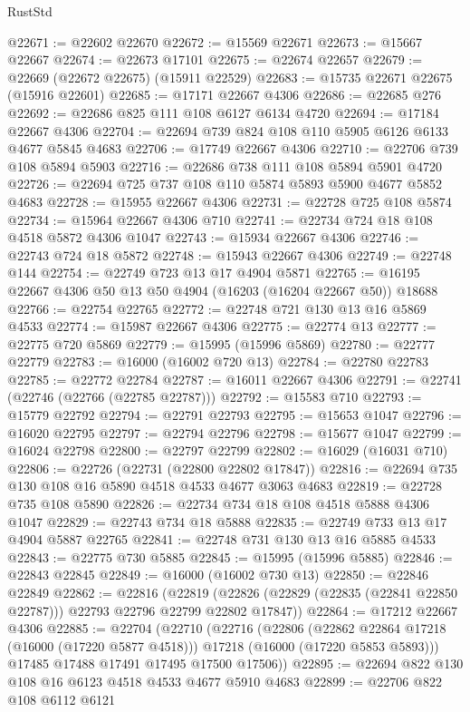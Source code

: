 \begin{lexlean}{RustStd}
\begin{coremodule}
@22671 := @22602 @22670
@22672 := @15569 @22671
@22673 := @15667 @22667
@22674 := @22673 @17101
@22675 := @22674 @22657
@22679 := @22669 (@22672 @22675) (@15911 @22529)
@22683 := @15735 @22671 @22675 (@15916 @22601)
@22685 := @17171 @22667 @4306
@22686 := @22685 @276
@22692 := @22686 @825 @111 @108 @6127 @6134 @4720
@22694 := @17184 @22667 @4306
@22704 := @22694 @739 @824 @108 @110 @5905 @6126 @6133 @4677 @5845 @4683
@22706 := @17749 @22667 @4306
@22710 := @22706 @739 @108 @5894 @5903
@22716 := @22686 @738 @111 @108 @5894 @5901 @4720
@22726 := @22694 @725 @737 @108 @110 @5874 @5893 @5900 @4677 @5852 @4683
@22728 := @15955 @22667 @4306
@22731 := @22728 @725 @108 @5874
@22734 := @15964 @22667 @4306 @710
@22741 := @22734 @724 @18 @108 @4518 @5872 @4306 @1047
@22743 := @15934 @22667 @4306
@22746 := @22743 @724 @18 @5872
@22748 := @15943 @22667 @4306
@22749 := @22748 @144
@22754 := @22749 @723 @13 @17 @4904 @5871
@22765 := @16195 @22667 @4306 @50 @13 @50 @4904 (@16203 (@16204 @22667 @50)) @18688
@22766 := @22754 @22765
@22772 := @22748 @721 @130 @13 @16 @5869 @4533
@22774 := @15987 @22667 @4306
@22775 := @22774 @13
@22777 := @22775 @720 @5869
@22779 := @15995 (@15996 @5869)
@22780 := @22777 @22779
@22783 := @16000 (@16002 @720 @13)
@22784 := @22780 @22783
@22785 := @22772 @22784
@22787 := @16011 @22667 @4306
@22791 := @22741 (@22746 (@22766 (@22785 @22787)))
@22792 := @15583 @710
@22793 := @15779 @22792
@22794 := @22791 @22793
@22795 := @15653 @1047
@22796 := @16020 @22795
@22797 := @22794 @22796
@22798 := @15677 @1047
@22799 := @16024 @22798
@22800 := @22797 @22799
@22802 := @16029 (@16031 @710)
@22806 := @22726 (@22731 (@22800 @22802 @17847))
@22816 := @22694 @735 @130 @108 @16 @5890 @4518 @4533 @4677 @3063 @4683
@22819 := @22728 @735 @108 @5890
@22826 := @22734 @734 @18 @108 @4518 @5888 @4306 @1047
@22829 := @22743 @734 @18 @5888
@22835 := @22749 @733 @13 @17 @4904 @5887 @22765
@22841 := @22748 @731 @130 @13 @16 @5885 @4533
@22843 := @22775 @730 @5885
@22845 := @15995 (@15996 @5885)
@22846 := @22843 @22845
@22849 := @16000 (@16002 @730 @13)
@22850 := @22846 @22849
@22862 := @22816
    (@22819 (@22826 (@22829 (@22835 (@22841 @22850 @22787))) @22793 @22796 @22799 @22802 @17847))
@22864 := @17212 @22667 @4306
@22885 := @22704
    (@22710
      (@22716
        (@22806
          (@22862 @22864 @17218 (@16000 (@17220 @5877 @4518)))
          @17218
          (@16000 (@17220 @5853 @5893)))
        @17485
        @17488
        @17491
        @17495
        @17500
        @17506))
@22895 := @22694 @822 @130 @108 @16 @6123 @4518 @4533 @4677 @5910 @4683
@22899 := @22706 @822 @108 @6112 @6121

\end{coremodule}
\end{lexlean}
